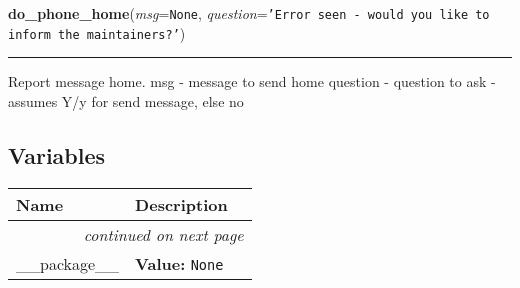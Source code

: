     \label{shutit_main:do_phone_home}

    \vspace{0.5ex}

\hspace{.8\funcindent}\begin{boxedminipage}{\funcwidth}

    \raggedright \textbf{do\_phone\_home}(\textit{msg}={\tt None}, \textit{question}={\tt \texttt{'}\texttt{Error seen - would you like to inform the maintainers?}\texttt{'}})

    \vspace{-1.5ex}

    \rule{\textwidth}{0.5\fboxrule}
\setlength{\parskip}{2ex}
    Report message home. msg - message to send home question - question to 
    ask - assumes Y/y for send message, else no

\setlength{\parskip}{1ex}
    \end{boxedminipage}



  \subsection{Variables}

    \vspace{-1cm}
\hspace{\varindent}\begin{longtable}{|p{\varnamewidth}|p{\vardescrwidth}|l}
\cline{1-2}
\cline{1-2} \centering \textbf{Name} & \centering \textbf{Description}& \\
\cline{1-2}
\endhead\cline{1-2}\multicolumn{3}{r}{\small\textit{continued on next page}}\\\endfoot\cline{1-2}
\endlastfoot\raggedright \_\-\_\-p\-a\-c\-k\-a\-g\-e\-\_\-\_\- & \raggedright \textbf{Value:} 
{\tt None}&\\
\cline{1-2}
\end{longtable}

